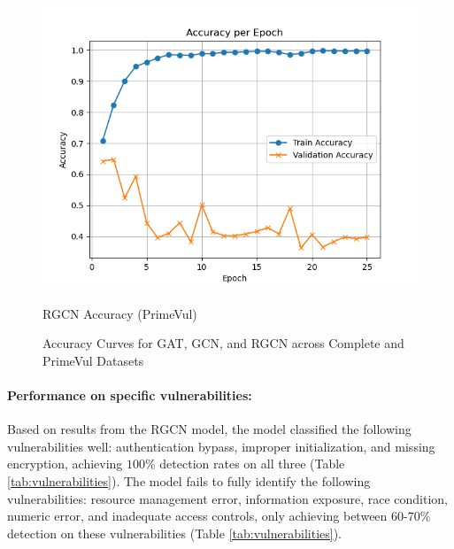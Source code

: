 \documentclass{article}
\begin{document}
\begin{figure}[h]
\begin{minipage}{0.32\textwidth}
        \includegraphics[width=\textwidth]{pv_rgcn_acc.png}
        \caption{RGCN Accuracy (PrimeVul)}
        \label{fig:pv_rgcn_acc}
    \end{minipage}

    \caption{Accuracy Curves for GAT, GCN, and RGCN across Complete and PrimeVul Datasets}
    \label{fig:acc_curves}
\end{figure}

\paragraph{Performance on specific vulnerabilities:}\label{sec:performance-on-vulns} Based on results from the RGCN model, the model classified the following vulnerabilities well: authentication bypass, improper initialization, and missing encryption, achieving $100$\% detection rates on all three (Table \ref{tab:vulnerabilities}). The model fails to fully identify the following vulnerabilities: resource management error, information exposure, race condition, numeric error, and inadequate access controls, only achieving between $60$-$70$\% detection on these vulnerabilities (Table \ref{tab:vulnerabilities}).
\end{document}
